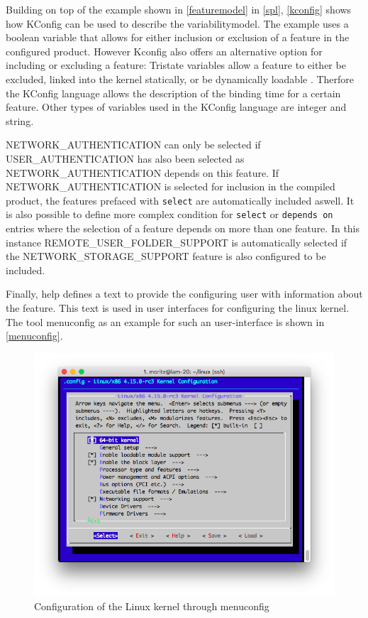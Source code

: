 \documentclass[a4paper]{article}
\begin{document}
Building on top of the example shown in \autoref{featuremodel} in \ref{spl}, \autoref{kconfig} shows how KConfig can be used to describe the variabilitymodel. The example uses a boolean variable that allows for either inclusion or exclusion of a feature in the configured product. However Kconfig also offers an alternative option for including or excluding a feature: Tristate variables allow a feature to either be excluded, linked into the kernel statically, or be dynamically loadable \cite{variabilitymodel-linux}. Therfore the KConfig language allows the description of the binding time for a certain feature. Other types of variables used in the KConfig language are integer and string.

NETWORK\_AUTHENTICATION can only be selected if USER\_AUTHENTICATION has also been selected as NETWORK\_AUTHENTICATION depends on this feature. If NETWORK\_AUTHENTICATION is selected for inclusion in the compiled product, the features prefaced with \texttt{select} are automatically included aswell. It is also possible to define more complex condition for \texttt{select} or \texttt{depends on} entries where the selection of a feature depends on more than one feature. In this instance REMOTE\_USER\_FOLDER\_SUPPORT is automatically selected if the NETWORK\_STORAGE\_SUPPORT feature is also configured to be included.

Finally, help defines a text to provide the configuring user with information about the feature. This text is used in user interfaces for configuring the linux kernel. The tool menuconfig as an example for such an user-interface is shown in \autoref{menuconfig}.

\begin{figure}[h] 
  \centering
  \begin{minipage}[b]{1\textwidth} 
    \caption[Menuconfig Screenshot]{Configuration of the Linux kernel through menuconfig}\label{menuconfig}
    \includegraphics[width=1\textwidth]{img/menuconfig.png}
  \end{minipage}
\end{figure}
\end{document}
